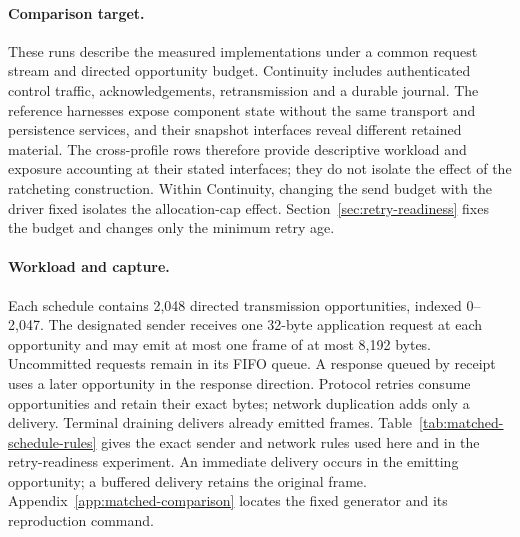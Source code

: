 \documentclass[pdflatex]{sn-jnl}
\theoremstyle{thmstyleone}
\theoremstyle{thmstylethree}
\theoremstyle{thmstyletwo}
\begin{document}
\paragraph{Comparison target.}
These runs describe the measured implementations under a common request
stream and directed opportunity budget. Continuity includes authenticated
control traffic, acknowledgements, retransmission and a durable journal.
The reference harnesses expose component state without the same transport
and persistence services, and their snapshot interfaces reveal different
retained material. The cross-profile rows therefore provide descriptive
workload and exposure accounting at their stated interfaces; they do not
isolate the effect of the ratcheting construction. Within Continuity,
changing the send budget with the driver fixed isolates the allocation-cap
effect. Section~\ref{sec:retry-readiness} fixes the budget and changes only
the minimum retry age.

\paragraph{Workload and capture.}
Each schedule contains 2,048 directed transmission opportunities, indexed
0--2,047. The designated sender receives one 32-byte application request at
each opportunity and may emit at most one frame of at most 8,192 bytes.
Uncommitted requests remain in its FIFO queue. A response queued by receipt
uses a later opportunity in the response direction. Protocol retries consume
opportunities and retain their exact bytes; network duplication adds only a
delivery. Terminal draining delivers already emitted frames.
Table~\ref{tab:matched-schedule-rules} gives the exact sender and network
rules used here and in the retry-readiness experiment. An immediate
delivery occurs in the emitting opportunity; a buffered delivery retains
the original frame. Appendix~\ref{app:matched-comparison} locates the
fixed generator and its reproduction command.
\end{document}
